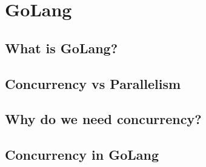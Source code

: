 \section{GoLang}
\label{sec:GoLang}


\subsection{What is GoLang?}
\label{sub:What is GoLang?}


\subsection{Concurrency vs Parallelism}
\label{sub:Concurrency vs Parallism}


\subsection{Why do we need concurrency?}
\label{sub:Why do we need parallism}


\subsection{Concurrency in GoLang}
\label{sub:Concurrency in GoLang}

